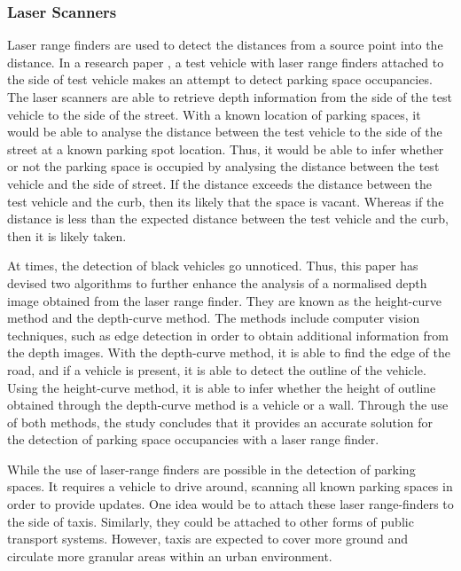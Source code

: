 \subsubsection*{Laser Scanners}
Laser range finders are used to detect the distances from a source point into the distance. In a research paper \citep{ono_probe_2002}, a test vehicle with laser range finders attached to the side of test vehicle makes an attempt to detect parking space occupancies. The laser scanners are able to retrieve depth information from the side of the test vehicle to the side of the street. With a known location of parking spaces, it would be able to analyse the distance between the test vehicle to the side of the street at a known parking spot location. Thus, it would be able to infer whether or not the parking space is occupied by analysing the distance between the test vehicle and the side of street. If the distance exceeds the distance between the test vehicle and the curb, then its likely that the space is vacant. Whereas if the distance is less than the expected distance between the test vehicle and the curb, then it is likely taken.

At times, the detection of black vehicles go unnoticed. Thus, this paper has devised two algorithms to further enhance the analysis of a normalised depth image obtained from the laser range finder. They are known as the height-curve method and the depth-curve method. The methods include computer vision techniques, such as edge detection in order to obtain additional information from the depth images. With the depth-curve method, it is able to find the edge of the road, and if a vehicle is present, it is able to detect the outline of the vehicle. Using the height-curve method, it is able to infer whether the height of outline obtained through the depth-curve method is a vehicle or a wall. Through the use of both methods, the study concludes that it provides an accurate solution for the detection of parking space occupancies with a laser range finder.

While the use of laser-range finders are possible in the detection of parking spaces. It requires a vehicle to drive around, scanning all known parking spaces in order to provide updates. One idea would be to attach these laser range-finders to the side of taxis. Similarly, they could be attached to other forms of public transport systems. However, taxis are expected to cover more ground and circulate more granular areas within an urban environment.